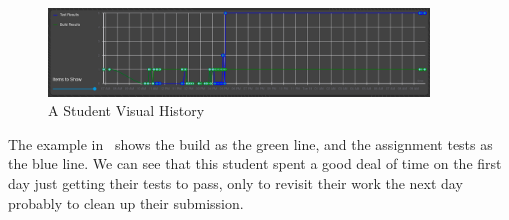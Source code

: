 \begin{figure}[ht]
    \centering
    \includegraphics[width=0.9\textwidth]{figures/student-assignment-visual-history-1.png}
    \caption{A Student Visual History\label{fig:student-assignment-visual-history-1}}
\end{figure}

The example in~ shows the build as the green
line, and the assignment tests as the blue line.
We can see that this student spent a good deal of time on the first day
just getting their tests to pass, only to revisit their work the next day probably to
clean up their submission.
